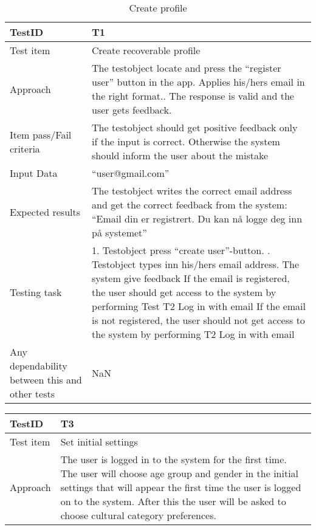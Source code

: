 {{\begin{table}[!h]
	\begin{center}
		\begin{tabular}{| p{5cm} | p{12cm} |}
			\hline
			TestID & T1 \\ \hline
			Test item & Create recoverable profile  \\ \hline
			Approach & The testobject locate and press the “register user” button in the app. Applies his/hers email in the right format.. The response is valid and the user gets feedback.  \\ \hline
			Item pass/Fail criteria & The testobject should get positive feedback only if the input is correct. Otherwise the system should inform the user about the mistake  \\ \hline
			Input Data & “user@gmail.com”  \\ \hline
			Expected results & The testobject writes the correct email address and get the correct feedback from the system: “Email din er registrert. Du kan nå logge deg inn på systemet”   \\ \hline
			Testing task & 1. Testobject press “create user”-button. \newline 2. Testobject types inn his/hers email address\newline
			3. The system give feedback \newline 4.1 If the email is registered, the user should get access to the system by        performing Test T2 Log in with email\newline 4.2 If the email is not registered, the user should not get access to the system by performing T2 Log in with email  \\ \hline
			Any dependability between this and other tests & NaN  \\ \hline
		\end{tabular}
	\end{center}
	\caption{Create profile}
	\label{Tab_systemtest1}
\end{table}

\begin{table}[!h]
	\begin{center}
		\begin{tabular}{| p{5cm} | p{12cm} |}
			\hline
			TestID & T3 \\ \hline
			Test item & Set initial settings  \\ \hline
			
			Approach & The user is logged in to the system for the first time. The user will choose age group and gender in the initial settings that will appear the first time the user is logged on to the system. After this the user will be asked to choose cultural category preferences.   \\ \hline
			

\end{tabular}
\end{center}
\end{table}}}
